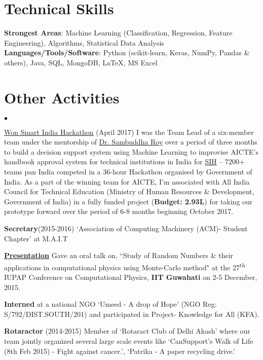 \documentclass[margin,line]{res}
\newenvironment{list2}{
  \begin{list}{$\bullet$}{%
      \setlength{\itemsep}{0in}
      \setlength{\parsep}{0in} \setlength{\parskip}{0in}
      \setlength{\topsep}{0in} \setlength{\partopsep}{0in}
      \setlength{\leftmargin}{0.2in}}}{\end{list}}
\begin{document}
\begin{resume}
\section{\sc Technical Skills}
{\bf Strongest Areas}: Machine Learning (Classification, Regression, Feature Engineering), Algorithms, Statistical Data Analysis\\
{\bf Languages/Tools/Software}: Python (scikit-learn, Keras, NumPy, Pandas \& others), Java, SQL, MongoDB, \LaTeX, MS Excel

\section{\sc Other Activities}
\begin{list2}
\item {\href{https://www.linkedin.com/feed/update/urn:li:activity:6255398180318470144}{\color{blue} Won Smart India Hackathon}} (April 2017) I was the Team Lead of a six-member team under the mentorship of {\href{https://www.linkedin.com/in/sambuddharoy/}{\color{blue} Dr. Sambuddha Roy}} over a period of three months to build a decision support system using Machine Learning to improvise AICTE's handbook approval system for technical institutions in India for {\href{https://www.linkedin.com/pulse/smart-india-hackathon-2017-anirban-sarker}{\color{blue} SIH}} -- 7200+ teams pan India competed in a 36-hour Hackathon organised by Government of India. As a part of the winning team for AICTE, I'm associated with All India Council for Technical Education (Ministry of Human Resources \& Development, Government of India) in a fully funded project ({\bf Budget: 2.93L}) for taking our prototype forward over the period of 6-8 months beginning October 2017. 
\item {\bf Secretary}(2015-2016)  `Association of Computing Machinery (ACM)- Student Chapter' at M.A.I.T
\item {\bf {\href{https://drive.google.com/open?id=0B8hsJozmBILEcGRiT2VzZ0hFUEE}{\color{blue} Presentation}}} Gave an oral talk on, ``Study of Random Numbers \& their applications in computational physics using Monte-Carlo method" at the 27\textsuperscript{th} IUPAP Conference on Computational Physics, {\bf IIT Guwahati} on 2-5 December, 2015.
\item {\bf Interned} at a national NGO `Umeed - A drop of Hope' (NGO Reg: S/792/DIST.SOUTH/201) and participated in Project- Knowledge for All (KFA).
\item {\bf Rotaractor} (2014-2015) Member of `Rotaract Club of Delhi Akash' where our team jointly organized several large scale events like `CanSupport's Walk of Life (8th Feb 2015) - Fight against cancer.', 
`Patrika - A paper recycling drive.'
\end{list2}


\end{resume}
\end{document}
